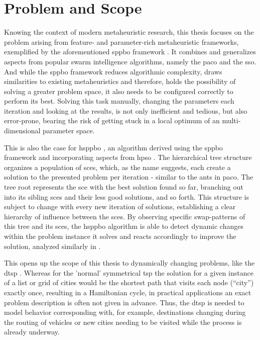 \section{Problem and Scope}

Knowing the context of modern metaheuristic research, this thesis focuses on the problem arising from feature- and parameter-rich metaheuristic frameworks, exemplified by the aforementioned \gls{sppbo} framework \cite{lin2015simple}. It combines and generalizes aspects from popular swarm intelligence algorithms, namely the \gls{paco} and the \gls{sso}. And while the \gls{sppbo} framework reduces algorithmic complexity, draws similarities to existing metaheuristics and therefore, holds the possibility of solving a greater problem space, it also needs to be configured correctly to perform its best. Solving this task manually, changing the parameters each iteration and looking at the results, is not only inefficient and tedious, but also error-prone, bearing the risk of getting stuck in a local optimum of an multi-dimensional parameter space.

This is also the case for \gls{hsppbo} \cite{kupfer2021hierarchical}, an algorithm derived using the \gls{sppbo} framework and incorporating aspects from \gls{hpso} \cite{janson2003hierarchical}. The hierarchical tree structure organizes a population of \glspl{sce}, which, as the name suggests, each create a solution to the presented problem per iteration - similar to the ants in \gls{paco}. The tree root represents the \gls{sce} with the best solution found so far, branching out into its sibling \glspl{sce} and their less good solutions, and so forth. This structure is subject to change with every new iteration of solutions, establishing a clear hierarchy of influence between the \glspl{sce}. By observing specific swap-patterns of this tree and its \glspl{sce}, the \gls{hsppbo} algorithm is able to detect dynamic changes within the problem instance it solves and reacts accordingly to improve the solution, analyzed similarly in \cite{janson2004hierarchical}.

This opens up the scope of this thesis to dynamically changing problems, like the \gls{dtsp} \cite{psaraftis1995dynamic}. Whereas for the 'normal' symmetrical \gls{tsp} the solution for a given instance of a list or grid of cities would be the shortest path that visits each node (\enquote{city}) exactly once, resulting in a Hamiltonian cycle, in practical applications an exact problem description is often not given in advance. Thus, the \gls{dtsp} is needed to model behavior corresponding with, for example, destinations changing during the routing of vehicles or new cities needing to be visited while the process is already underway.


